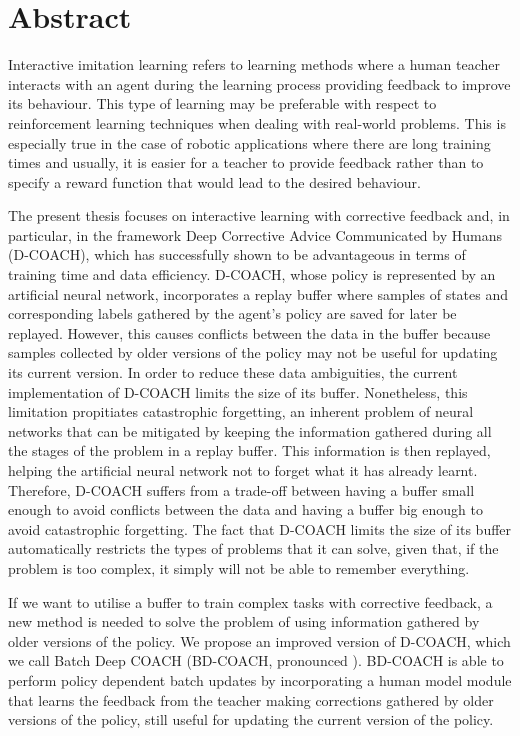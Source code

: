 \chapter*{Abstract}
Interactive imitation learning refers to learning methods where a human teacher interacts with an agent during the learning process providing feedback to improve its behaviour. This type of learning may be preferable with respect to reinforcement learning techniques when dealing with real-world problems. This is especially true in the case of robotic applications where there are long training times and usually, it is easier for a teacher to provide feedback rather than to specify a reward function that would lead to the desired behaviour.

\vspace{3mm} %

The present thesis focuses on interactive learning with corrective feedback and, in particular, in the framework Deep Corrective Advice Communicated by Humans (D-COACH), which has successfully shown to be advantageous in terms of training time and data efficiency. D-COACH, whose policy is represented by an artificial neural network, incorporates a replay buffer where samples of states and corresponding labels gathered by the agent's policy are saved for later be replayed. However, this causes conflicts between the data in the buffer because samples collected by older versions of the policy may not be useful for updating its current version. In order to reduce these data ambiguities, the current implementation of D-COACH limits the size of its buffer. Nonetheless, this limitation propitiates catastrophic forgetting, an inherent problem of neural networks that can be mitigated by keeping the information gathered during all the stages of the problem in a replay buffer. This information is then replayed, helping the artificial neural network not to forget what it has already learnt. Therefore, D-COACH suffers from a trade-off between having a buffer small enough to avoid conflicts between the data and having a buffer big enough to avoid catastrophic forgetting. The fact that D-COACH limits the size of its buffer automatically restricts the types of problems that it can solve, given that, if the problem is too complex, it simply will not be able to remember everything.




\vspace{3mm} %

If we want to utilise a buffer to train complex tasks with corrective feedback, a new method is needed to solve the problem of using information gathered by older versions of the policy. We propose an improved version of D-COACH, which we call Batch Deep COACH (BD-COACH, pronounced ). BD-COACH is able to perform policy dependent batch updates by incorporating a human model module that learns the feedback from the teacher making corrections gathered by older versions of the policy, still useful for updating the current version of the policy.

